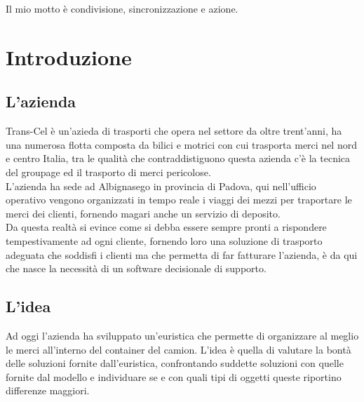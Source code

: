 \begin{savequote}[75mm]
    Il mio motto è condivisione, sincronizzazione e azione.
\end{savequote}

\chapter{Introduzione}
\label{introduzione}
\section{L'azienda}
Trans-Cel è un'azieda di trasporti che opera nel settore da oltre trent'anni, ha una numerosa flotta composta da bilici e motrici con cui trasporta merci nel nord e centro Italia, tra le qualità che contraddistiguono questa azienda c'è la tecnica del groupage ed il trasporto di merci pericolose.\\
L'azienda ha sede ad Albignasego in provincia di Padova, qui nell'ufficio operativo vengono organizzati in tempo reale i viaggi dei mezzi per traportare le merci dei clienti, fornendo magari anche un servizio di deposito.\\
Da questa realtà si evince come si debba essere sempre pronti a rispondere tempestivamente ad ogni cliente, fornendo loro una soluzione di trasporto adeguata che soddisfi i clienti ma che permetta di far fatturare l'azienda, è da qui che nasce la necessità di un software decisionale di supporto.

\section{L'idea}
Ad oggi l'azienda ha sviluppato un'euristica che permette di organizzare al meglio le merci all'interno del container del camion.
L'idea è quella di valutare la bontà delle soluzioni fornite dall'euristica, confrontando suddette soluzioni con quelle fornite dal modello e individuare se e con quali tipi di oggetti queste riportino differenze maggiori.

